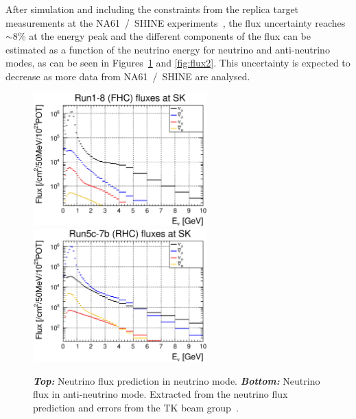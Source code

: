 After simulation and including the constraints from the replica target
measurements at the NA61~/~SHINE
experiments~\cite{Abgrall:2011ae,Abgrall:2011ts,Abgrall:2015hmv}, the
flux uncertainty reaches $\sim8\%$ at the energy peak and the
different components of the flux can be estimated as a function of the
neutrino energy for neutrino and anti-neutrino modes, as can be seen
in Figures~\ref{fig:flux1} and \ref{fig:flux2}. This uncertainty is
expected to decrease as more data from NA61~/~SHINE are analysed.

\begin{figure}[ht!]
  \center
  \includegraphics[width=0.6\textwidth]{images/t2k/SK_FHC_flux.eps} \\
  \includegraphics[width=0.6\textwidth]{images/t2k/SK_RHC_flux.eps}
  \caption[Neutrino flux prediction in (anti-) neutrino
  mode]{\textbf{\textit{Top:}} Neutrino flux prediction in neutrino
    mode. \textbf{\textit{Bottom:}} Neutrino flux in anti-neutrino
    mode. Extracted from the neutrino flux prediction and errors from
    the \Gls{TK} beam
    group~\cite{TomislavVladisavljevicFluxTuning2017,MarkHartzFluxUncertainty2017}.}
  \label{fig:flux1}
\end{figure}

